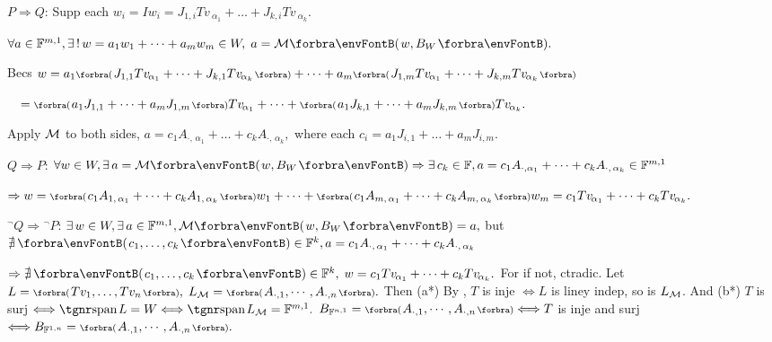 $P\Rightarrow Q:$\,\;Supp each $w_i=Iw_i=J_{1,i}Tv_{\:\!\!\alpha_1}+\dots+J_{k,i}Tv_{\:\!\!\alpha_k}.$\par\quad\Hb
$\forall a\in\Fbb^{m,1},\exists\,!\,w=a_1w_1+\dots+a_mw_m\in W,\;a=\Mt{w,B_W}.$\par\quad\Hb
{}Becs $w=a_1\BigPar{J_{1,1}Tv_{\:\!\!\alpha_1}+\dots+J_{k,1}Tv_{\:\!\!\alpha_k}}+\dots+a_m\BigPar{J_{1,m}Tv_{\:\!\!\alpha_1}+\dots+J_{k,m}Tv_{\:\!\!\alpha_k}}$\par\vspace{2pt}\quad\Hb
{} $\Blind{w}=\BigPar{a_1J_{1,1}+\dots+a_mJ_{1,m}}Tv_{\:\!\!\alpha_1}+\dots+\BigPar{a_1J_{k,1}+\dots+a_mJ_{k,m}}Tv_{\:\!\!\alpha_k}.$\par\vspace{2pt}\quad\Hb
{}Apply $\mathcal{M}$ to both sides, $a=c_1A_{\cdot,\,\alpha_1}+\dots+c_kA_{\cdot,\,\alpha_k},$ where each $c_i=a_1J_{i,1}+\dots+a_mJ_{i,m}.$\par\vspace{6pt}\quad\Hb
$Q\Rightarrow P:$\,\;$\forall w\in W,\exists\,\!\,a=\Mt{w,B_W}\Rightarrow\exists\,c_k\in\Fbb,a=c_1A_{\cdot,{\alpha_1}}+\dots+c_kA_{\cdot,\,\alpha_k}\in\Fbb^{m,1}$\par\quad\Hb
{}$\Rightarrow w=\BigPar{c_1A_{1,\,{\alpha_1}}+\dots+c_kA_{1,\,{\alpha_k}}}w_1+\dots+\BigPar{c_1A_{m,\,{\alpha_1}}+\dots+c_kA_{m,\,{\alpha_k}}}w_m=c_1Tv_{\:\!\!\alpha_1}+\dots+c_kTv_{\:\!\!\alpha_k}.$\vspace{6pt}\par\quad\Hb
${}{^\neg}Q\Rightarrow{}{^\neg}P:$\,\;$\exists\,w\in W,\exists\,a\in\Fbb^{m,1},\Mt{w,B_W}=a,$ but $\nexists\,\Par{c_1,\dots,c_k}\in\Fbb^k,a=c_1A_{\cdot,\,\alpha_1}+\dots+c_kA_{\cdot,\,\alpha_k}$\par\quad\Hb
{}$\Rightarrow\nexists\,\Par{c_1,\dots,c_k}\in\Fbb^k,\;w=c_1Tv_{\:\!\!\alpha_1}+\dots+c_kTv_{\:\!\!\alpha_k}.$ For if not, ctradic.\PfEnd\vspace{6pt}
\ANote Let $L=\BigPar{Tv_1,\dots,Tv_n},\;L_{\mM}=\BigPar{A_{\cdot,1},\cdots,A_{\cdot,n}}.$\parNot
Then (a*) By , $T$ is inje $\Longleftrightarrow L$ is liney indep, so is $L_{\mathcal{M}}$.\parNot
And (b*) $T$ is surj $\Longleftrightarrow\spn L=W\Longleftrightarrow\spn L_{\mM}=\Fbb^{m,1}.$\parNot
\ACoro $B_{\Fbb^{n,1}}=\BigPar{A_{\cdot,1},\cdots,A_{\cdot,n}}\Longleftrightarrow T$ is inje and surj $\Longleftrightarrow B_{\Fbb^{1,n}}=\BigPar{A_{\cdot,1},\cdots,A_{\cdot,n}}.$\parNot
